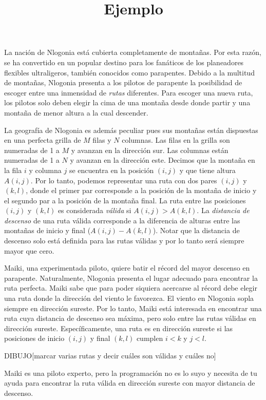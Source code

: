 \documentclass{oci}
\title{Ejemplo}
\begin{document}
\begin{problemDescription}

La nación de Nlogonia está cubierta completamente de montañas.
Por esta razón, se ha convertido en un popular destino para los fanáticos de los planeadores
flexibles ultraligeros, también conocidos como parapentes.
Debido a la multitud de montañas, Nlogonia presenta a los pilotos de parapente la posibilidad de
escoger entre una inmensidad de \emph{rutas} diferentes.
Para escoger una nueva ruta, los pilotos solo deben elegir la cima de una montaña desde donde
partir y una montaña de menor altura a la cual descender.

La geografía de Nlogonia es además peculiar pues sus montañas están dispuestas en una perfecta
grilla de $M$ filas y $N$ columnas.
Las filas en la grilla son numeradas de 1 a $M$ y avanzan en la dirección sur.
Las columnas están numeradas de 1 a $N$ y avanzan en la dirección este.
Decimos que la montaña en la fila $i$ y columna $j$ se encuentra en la posición $(i,j)$ y que
tiene altura $A(i,j)$.
Por lo tanto, podemos representar una ruta con dos pares $(i, j)$ y $(k,l)$, donde el primer par
corresponde a la posición de la montaña de inicio y el segundo par a la posición de la montaña
final.
La ruta entre las posiciones $(i, j)$ y $(k, l)$ es considerada \emph{válida} si $A(i, j) > A(k, l)$.
La \emph{distancia de descenso} de una ruta válida corresponde a la diferencia de alturas entre
las montañas de inicio y final ($A(i, j) - A(k, l)$).
Notar que la distancia de descenso solo está definida para las rutas válidas y por lo tanto será
siempre mayor que cero.

Maiki, una experimentada piloto, quiere batir el récord del mayor descenso en parapente.
Naturalmente, Nlogonia presenta el lugar adecuado para encontrar la ruta perfecta.
Maiki sabe que para poder siquiera acercarse al récord debe elegir una ruta donde la dirección
del viento le favorezca.
El viento en Nlogonia sopla siempre en dirección sureste.
Por lo tanto, Maiki está interesada en encontrar una ruta cuya distancia de descenso sea máxima,
pero solo entre las rutas válidas en dirección sureste.
Específicamente, una ruta es en dirección sureste si las posiciones de inicio $(i, j)$ y final $(k, l)$
cumplen $i < k$ y $j < l$.

DIBUJO[marcar varias rutas y decir cuáles son válidas y cuáles no]

Maiki es una piloto experto, pero la programación no es lo suyo y necesita de tu ayuda para
encontrar la ruta válida en dirección sureste con mayor distancia de descenso.

\end{problemDescription}
\end{document}
